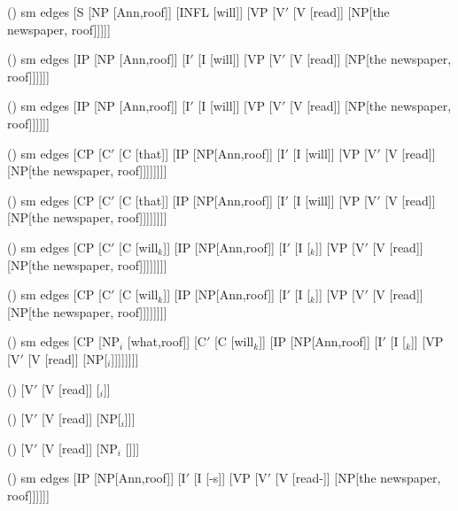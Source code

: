\begin {forest}()
 sm edges [S [NP [Ann,roof]] [INFL [will]] [VP [V$'$ [V [read]] [NP[the newspaper, roof]]]]] \end {forest}
\begin {forest}()
 sm edges [IP [NP [Ann,roof]] [I$'$ [I [will]] [VP [V$'$ [V [read]] [NP[the newspaper, roof]]]]]] \end {forest}
\begin {forest}()
 sm edges [IP [NP [Ann,roof]] [I$'$ [I [will]] [VP [V$'$ [V [read]] [NP[the newspaper, roof]]]]]] \end {forest}
\begin {forest}()
 sm edges [CP [C$'$ [C [that]] [IP [NP[Ann,roof]] [I$'$ [I [will]] [VP [V$'$ [V [read]] [NP[the newspaper, roof]]]]]]]] \end {forest}
\begin {forest}()
 sm edges [CP [C$'$ [C [that]] [IP [NP[Ann,roof]] [I$'$ [I [will]] [VP [V$'$ [V [read]] [NP[the newspaper, roof]]]]]]]] \end {forest}
\begin {forest}()
 sm edges [CP [C$'$ [C [will$_k$]] [IP [NP[Ann,roof]] [I$'$ [I [\trace $_k$]] [VP [V$'$ [V [read]] [NP[the newspaper, roof]]]]]]]] \end {forest}
\begin {forest}()
 sm edges [CP [C$'$ [C [will$_k$]] [IP [NP[Ann,roof]] [I$'$ [I [\trace $_k$]] [VP [V$'$ [V [read]] [NP[the newspaper, roof]]]]]]]] \end {forest}
\begin {forest}()
 sm edges [CP [NP$_i$ [what,roof]] [C$'$ [C [will$_k$]] [IP [NP[Ann,roof]] [I$'$ [I [\trace $_k$]] [VP [V$'$ [V [read]] [NP[\trace $_i$]]]]]]]] \end {forest}
\begin {forest}()
 [V$'$ [V [read]] [\trace $_i$]] \end {forest}
\begin {forest}()
 [V$'$ [V [read]] [NP[\trace $_i$]]] \end {forest}
\begin {forest}()
 [V$'$ [V [read]] [NP$_i$ [\trace ]]] \end {forest}
\begin {forest}()
 sm edges [IP [NP[Ann,roof]] [I$'$ [I [-s]] [VP [V$'$ [V [read-]] [NP[the newspaper, roof]]]]]] \end {forest}
